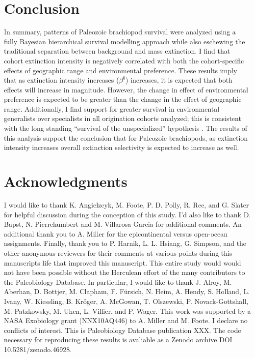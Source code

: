 \documentclass[11pt]{article}
\begin{document}
\section*{Conclusion}
In summary, patterns of Paleozoic brachiopod survival were analyzed using a fully Bayesian hierarchical survival modelling approach while also eschewing the traditional separation between background and mass extinction. I find that cohort extinction intensity is negatively correlated with both the cohort-specific effects of geographic range and environmental preference. These results imply that as extinction intensity increases (\(\beta^{0}\)) increases, it is expected that both effects will increase in magnitude. However, the change in effect of environmental preference is expected to be greater than the change in the effect of geographic range. Additionally, I find support for greater survival in environmental generalists over specialists in all origination cohorts analyzed; this is consistent with the long standing ``survival of the unspecialized'' hypothesis \citep{Liow2004a,Liow2007b,Simpson1944,Simpson1953,Smits2015,Nurnberg2015,Nurnberg2013a, Baumiller1993}. The results of this analysis support the conclusion that for Paleozoic brachiopods, as extinction intensity increases overall extinction selectivity is expected to increase as well.







\section*{Acknowledgments}

I would like to thank K. Angielzcyk, M. Foote, P. D. Polly, R. Ree, and G. Slater for helpful discussion during the conception of this study. I'd also like to thank D. Bapst, N. Pierrehumbert and M. Villarosa Garcia for additional comments. An additional thank you to  A. Miller for the epicontinental versus open-ocean assignments. Finally, thank you to P. Harnik, L. L. Hsiang, G. Simpson, and the other anonymous reviewers for their comments at various points during this manuscripts life that improved this manuscript. This entire study would would not have been possible without the Herculean effort of the many contributors to the Paleobiology Database. In particular, I would like to thank J. Alroy, M. Aberhan, D. Bottjer, M. Clapham, F. F\"{u}rsich, N. Heim, A. Hendy, S. Holland, L. Ivany, W. Kiessling, B. Kr\"{o}ger, A. McGowan, T. Olszewski, P. Novack-Gottshall, M. Patzkowsky, M. Uhen, L. Villier, and P. Wager. This work was supported by a NASA Exobiology grant (NNX10AQ446) to A. Miller and M. Foote. I declare no conflicts of interest. This is Paleobiology Database publication XXX. The code necessary for reproducing these results is avaliable as a Zenodo archive DOI 10.5281/zenodo.46928.
\end{document}
